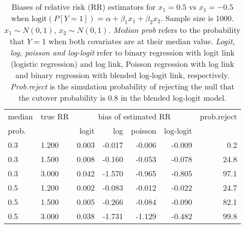 \documentclass[12pt,a4paper]{article}
\begin{document}
\begin{table}[H] 
\small\sf\centering 
\caption{Biases of relative risk (RR) estimators for $x_1=0.5$ vs $x_1=-0.5$ when $\mbox{logit}(P[Y=1])=\alpha+\beta_1 x_1 + \beta_2 x_2$. Sample size is 1000. $x_1 \sim $$N(0,1)$, $x_2 \sim N(0,1)$. {\it Median prob} refers to the probability that $Y=1$ when both covariates are at their median value. {\it Logit, log, poisson and log-logit} refer to binary regression with logit link (logistic regression) and log link, Poisson regression with log link and binary regression with blended log-logit link, respectively. {\it Prob.reject} is the simulation probability of rejecting the null that the cutover probability is $0.8$ in the blended log-logit model.} 
\begin{tabular}{llrrrrr} 
\toprule 
median & true RR & \multicolumn{4}{c}{bias of estimated RR} & prob.reject \\ 
prob. & & logit & log & poisson & log-logit  & \\ \midrule 
0.3 & 1.200 & 0.003 & -0.017 & -0.006 & -0.009 &  0.2 \\  
0.3 & 1.500 & 0.008 & -0.160 & -0.053 & -0.078 & 24.8 \\  
0.3 & 3.000 & 0.042 & -1.570 & -0.965 & -0.805 & 97.1 \\  
0.5 & 1.200 & 0.002 & -0.083 & -0.012 & -0.022 & 24.7 \\  
0.5 & 1.500 & 0.005 & -0.266 & -0.084 & -0.090 & 82.1 \\  
0.5 & 3.000 & 0.038 & -1.731 & -1.129 & -0.482 & 99.8 \\  
\bottomrule 
\end{tabular} 
\end{table} 
\end{document}
